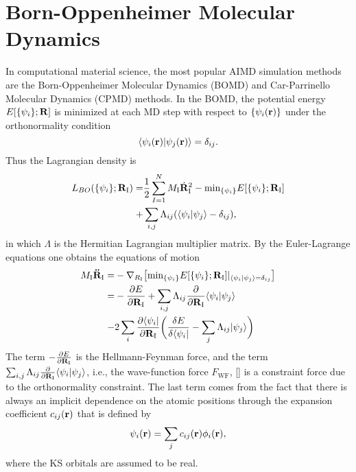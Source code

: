 \section{Born-Oppenheimer Molecular Dynamics}\label{section_BOMD}
In computational material science, the most popular AIMD simulation methods are the Born-Oppenheimer Molecular Dynamics (BOMD) and Car-Parrinello Molecular Dynamics (CPMD) methods. 
In the BOMD, the potential energy $E[\{\psi_i\};\bf{R}]$ is minimized at each MD step with respect to $\{\psi_i({\bf r})\}$  under the orthonormality condition
\begin{equation}
\langle\psi_i({\bf{r}})|\psi_j({\bf r})\rangle=\delta_{ij}.
\label{eq:e_XC}
\end{equation}
Thus the Lagrangian density is 
\begin{align}
L_{BO} (\{\psi_i\}; {\bf R}_{\text{I}})=&\frac{1}{2}\sum^N_{I=1}M_{\text{I}}\dot{\bf R}^2_{\text{I}} - {\text{min}}_{\{\psi_i\}}E[\{\psi_i\};{\bf R}_{\text{I}}] \nonumber \\
             +& \sum_{i,j}\Lambda_{ij}(\langle\psi_i|\psi_j\rangle-\delta_{ij} ),
\label{eq:L_BO}
\end{align}
in which $\Lambda$ is the Hermitian Lagrangian multiplier matrix. By the Euler-Lagrange equations one obtains the equations of motion
\begin{align}
     M_{\text{I}}{\bf \ddot{R}}_{\text{I}} =& -\nabla_{R_{\text{I}}} \bigl[ {\text{min}}_{\{\psi_i\}}E[\{\psi_i\};{\bf R}_{\text{I}}] |_{\langle\psi_i|\psi_j\rangle=\delta_{ij} }\bigr]\nonumber \\
     =&-\frac{\partial E}{\partial {\bf R}_{\text{I}}}  + \sum_{i,j}\Lambda_{ij}\frac{\partial}{\partial {\bf R}_{\text{I}}}\langle\psi_i|\psi_j\rangle \nonumber \\
     -&2\sum_i \frac{\partial \langle\psi_i|}{\partial {\bf R}_{\text{I}}}\biggl(\frac{\delta E}{\delta\langle\psi_i|}-\sum_j \Lambda_{ij}|\psi_j\rangle\biggr) 
\label{eq:LEE_BO}
\end{align}
The term $-\frac{\partial E}{\partial {\bf R}_{\text{I}}}$ is the Hellmann-Feynman force, and the term $\sum_{i,j}\Lambda_{ij}\frac{\partial}{\partial {\bf R}_{\text{I}}}\langle\psi_i|\psi_j\rangle$, i.e., the wave-function force $F_{\text{WF}}$, [\cite{Pulay69}] is a constraint force due to the orthonormality constraint. The last term comes from the fact that there is always an implicit dependence on the atomic positions through the expansion coefficient $c_{ij}({\bf r})$ that is defined by 
\begin{equation}
\psi_i({\bf r})=\sum_j c_{ij}({\bf r})\phi_i({\bf r}),
\label{eq:linear_combination}
\end{equation}
where the KS orbitals are assumed to be real.

